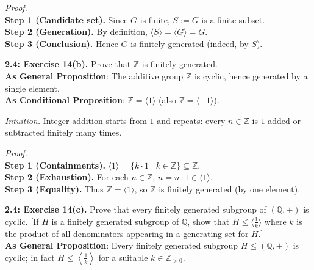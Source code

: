 \documentclass[12pt]{article}
\theoremstyle{definition}
\begin{document}
\dotfill

\emph{Proof.}\\
\textbf{Step 1 (Candidate set).} Since $G$ is finite, $S:=G$ is a finite subset.\\
\textbf{Step 2 (Generation).} By definition, $\langle S\rangle=\langle G\rangle=G$.\\
\textbf{Step 3 (Conclusion).} Hence $G$ is finitely generated (indeed, by $S$).\\

\newpage



\noindent \textbf{2.4: Exercise 14(b).} Prove that $\mathbb Z$ is finitely generated.\\ %

\noindent\textbf{As General Proposition}: The additive group $\mathbb Z$ is cyclic, hence generated by a single element.\\

\noindent \textbf{As Conditional Proposition}: $\mathbb Z=\langle 1\rangle$ (also $\mathbb Z=\langle -1\rangle$).

\newpage

\dotfill

\emph{Intuition.} Integer addition starts from $1$ and repeats: every $n\in\mathbb Z$ is $1$ added or subtracted finitely many times.\\

\dotfill

\emph{Proof.}\\
\textbf{Step 1 (Containments).} $\langle 1\rangle=\{k\cdot 1\mid k\in\mathbb Z\}\subseteq\mathbb Z$.\\
\textbf{Step 2 (Exhaustion).} For each $n\in\mathbb Z$, $n=n\cdot 1\in\langle 1\rangle$.\\
\textbf{Step 3 (Equality).} Thus $\mathbb Z=\langle 1\rangle$, so $\mathbb Z$ is finitely generated (by one element).\\

\newpage



\noindent \textbf{2.4: Exercise 14(c).} Prove that every finitely generated subgroup of $(\mathbb Q,+)$ is cyclic. [If $H$ is a finitely generated subgroup of $\mathbb Q$, show that $H\le \langle \tfrac{1}{k}\rangle$ where $k$ is the product of all denominators appearing in a generating set for $H$.]\\ %

\noindent\textbf{As General Proposition}: Every finitely generated subgroup $H\le(\mathbb Q,+)$ is cyclic; in fact $H\le \left\langle\frac{1}{k}\right\rangle$ for a suitable $k\in\mathbb Z_{>0}$.\\
\end{document}
